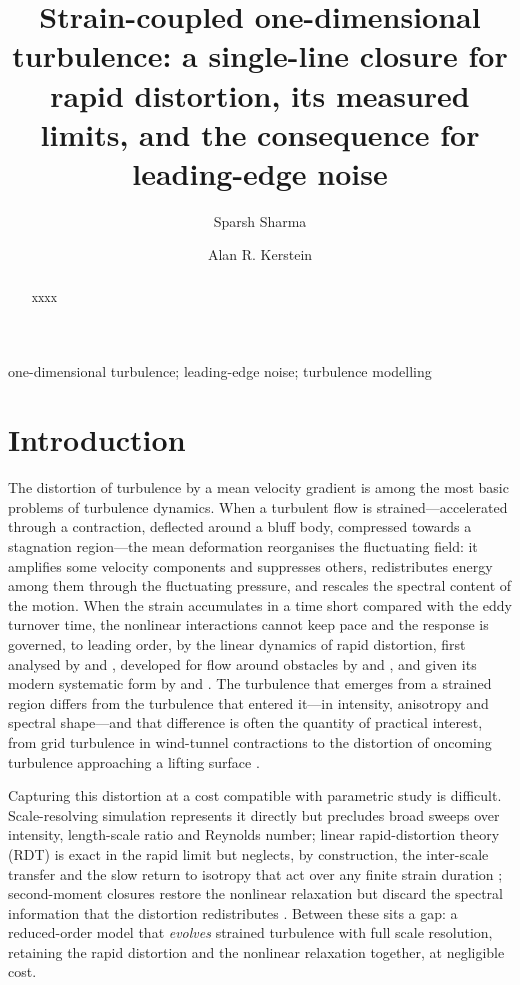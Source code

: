 \documentclass[lineno]{JFM-FLM_Au}
\title{Strain-coupled one-dimensional turbulence: a single-line closure for rapid distortion, its measured limits, and the consequence for leading-edge noise}
\author{Sparsh Sharma\aff{1} \and Alan R. Kerstein\aff{2}}
\affiliation{
\aff{1}German Aerospace Center (DLR), 38108 Braunschweig, Germany
\aff{2}Consultant, Danville, CA 94526, USA
}
\begin{document}
\maketitle

\begin{abstract}
xxxx
\end{abstract}

\begin{keywords}
one-dimensional turbulence; leading-edge noise; turbulence modelling
\end{keywords}

\section{Introduction}\label{sec:intro}
The distortion of turbulence by a mean velocity gradient is among the
most basic problems of turbulence dynamics. When a turbulent flow is
strained---accelerated through a contraction, deflected around a bluff
body, compressed towards a stagnation region---the mean deformation
reorganises the fluctuating field: it amplifies some velocity components
and suppresses others, redistributes energy among them through the
fluctuating pressure, and rescales the spectral content of the motion.
When the strain accumulates in a time short compared with the eddy
turnover time, the nonlinear interactions cannot keep pace and the
response is governed, to leading order, by the linear dynamics of rapid
distortion, first analysed by \citet{BatchelorProudman1954} and
\citet{TownsendBook1976}, developed for flow around obstacles by
\citet{Hunt1973} and \citet{HuntGraham1978}, and given its modern
systematic form by \citet{HuntCarruthers1990} and
\citet{SagautCambon2018}. The turbulence that emerges from a strained
region differs from the turbulence that entered it---in intensity,
anisotropy and spectral shape---and that difference is often the
quantity of practical interest, from grid turbulence in wind-tunnel
contractions \citep{MillsCorrsin1959,TuckerReynolds1968,LeeReynolds1985}
to the distortion of oncoming turbulence approaching a lifting surface
\citep{HuntGraham1978,GoldsteinAtassi1976}.

Capturing this distortion at a cost compatible with parametric study is
difficult. Scale-resolving simulation represents it directly but
precludes broad sweeps over intensity, length-scale ratio and Reynolds
number; linear rapid-distortion theory (RDT) is exact in the rapid limit
but neglects, by construction, the inter-scale transfer and the slow
return to isotropy that act over any finite strain duration
\citep{SagautCambon2018}; second-moment closures restore the nonlinear
relaxation but discard the spectral information that the distortion
redistributes \citep{LaunderReeceRodi1975,Pope2000}. Between these sits
a gap: a reduced-order model that \emph{evolves} strained turbulence
with full scale resolution, retaining the rapid distortion and the
nonlinear relaxation together, at negligible cost.
\end{document}
